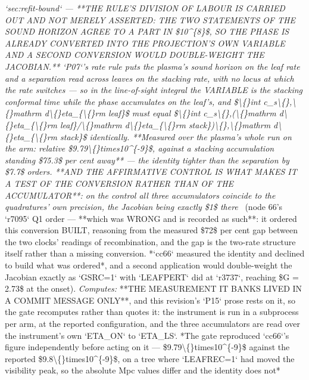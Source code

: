 \begin{description}
\textit{`sec:refit-bound` ---  **THE RULE'S DIVISION OF LABOUR IS CARRIED OUT AND NOT MERELY ASSERTED: THE TWO STATEMENTS OF THE SOUND HORIZON AGREE TO A PART IN \$10\textasciicircum{}\{8\}\$, SO THE PHASE IS ALREADY CONVERTED INTO THE PROJECTION'S OWN VARIABLE AND A SECOND CONVERSION WOULD DOUBLE-WEIGHT THE JACOBIAN.** `P07`'s rate rule puts the plasma's sound horizon on the leaf rate and a separation read across leaves on the stacking rate, with no locus at which the rate switches --- so in the line-of-sight integral the VARIABLE is the stacking conformal time while the phase accumulates on the leaf's, and \$\textbackslash\{\}int c\_s\textbackslash\{\},\textbackslash\{\}mathrm d\textbackslash\{\}eta\_\{\textbackslash\{\}rm leaf\}\$ must equal \$\textbackslash\{\}int c\_s\textbackslash\{\},(\textbackslash\{\}mathrm d\textbackslash\{\}eta\_\{\textbackslash\{\}rm leaf\}/\textbackslash\{\}mathrm d\textbackslash\{\}eta\_\{\textbackslash\{\}rm stack\})\textbackslash\{\},\textbackslash\{\}mathrm d\textbackslash\{\}eta\_\{\textbackslash\{\}rm stack\}\$ identically. **Measured over the plasma's whole run on the arm: relative \$9.79\textbackslash\{\}times10\textasciicircum{}\{-9\}\$, against a stacking accumulation standing \$75.3\$ per cent away** --- the identity tighter than the separation by \$7.7\$ orders.  **AND THE AFFIRMATIVE CONTROL IS WHAT MAKES IT A TEST OF THE CONVERSION RATHER THAN OF THE ACCUMULATOR**: on the control all three accumulators coincide to the quadratures' own precision, the Jacobian being exactly \$1\$ there} \ (node 66's `r7095` Q1 order --- **which was WRONG and is recorded as such**: it ordered this conversion BUILT, reasoning from the measured \$72\$ per cent gap between the two clocks' readings of recombination, and the gap is the two-rate structure itself rather than a missing conversion. *`cc66` measured the identity and declined to build what was ordered*, and a second application would double-weight the Jacobian exactly as `GSRC=1` with `LEAFPERT` did at `r3737`, reaching \$G = 2.73\$ at the onset). 
\emph{Computes:}  **THE MEASUREMENT IT BANKS LIVED IN A COMMIT MESSAGE ONLY**, and this revision's `P15` prose rests on it, so the gate recomputes rather than quotes it: the instrument is run in a subprocess per arm, at the reported configuration, and the three accumulators are read over the instrument's own `ETA\_ON` to `ETA\_LS`.  *The gate reproduced `cc66`'s figure independently before acting on it --- \$9.79\textbackslash\{\}times10\textasciicircum{}\{-9\}\$ against the reported \$9.8\textbackslash\{\}times10\textasciicircum{}\{-9\}\$, on a tree where `LEAFREC=1` had moved the visibility peak, so the absolute Mpc values differ and the identity does not*

\end{description}
